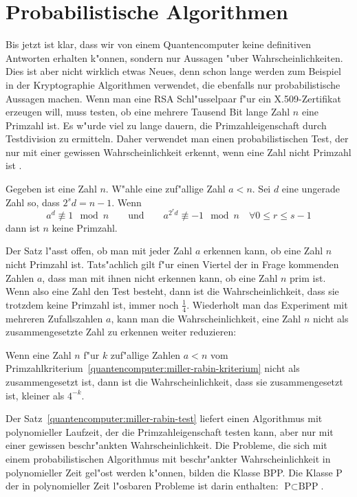 \section{Probabilistische Algorithmen}
Bis jetzt ist klar, dass wir von einem Quantencomputer keine definitiven
Antworten erhalten k"onnen, sondern nur Aussagen "uber Wahrscheinlichkeiten.
Dies ist aber nicht wirklich etwas Neues, denn schon lange werden
zum Beispiel in der Kryptographie Algorithmen verwendet, die ebenfalls
nur probabilistische Aussagen machen.
Wenn man eine RSA Schl"usselpaar f"ur ein X.509-Zertifikat erzeugen will,
muss testen, ob eine mehrere Tausend Bit lange Zahl $n$ eine Primzahl ist.
Es w"urde viel zu lange dauern, die Primzahleigenschaft durch Testdivision 
zu ermitteln.
Daher verwendet man einen probabilistischen Test, der nur mit einer
gewissen Wahrscheinlichkeit erkennt, wenn eine Zahl nicht Primzahl ist
\cite{skript:miller-rabin}.

\begin{satz}
\label{quantencomputer:miller-rabin-kriterium}
Gegeben ist eine Zahl $n$. W"ahle eine zuf"allige Zahl $a<n$. Sei $d$
eine ungerade Zahl so, dass $2^sd=n-1$. Wenn 
\[
a^d\not\equiv 1\mod n
\qquad\text{und}\qquad
a^{2^rd}\not\equiv -1\mod n\quad\forall 0\le r\le s-1
\]
dann ist $n$ keine Primzahl.
\end{satz}

Der Satz l"asst offen, ob man mit jeder Zahl $a$ erkennen kann, ob
eine Zahl $n$ nicht Primzahl ist.
Tats"achlich gilt f"ur einen Viertel der in Frage kommenden Zahlen
$a$, dass man mit ihnen nicht erkennen kann, ob eine Zahl $n$ prim ist.
Wenn also eine Zahl den Test besteht, dann ist die Wahrscheinlichkeit,
dass sie trotzdem keine Primzahl ist, immer noch $\frac14$. Wiederholt
man das Experiment mit mehreren Zufallszahlen $a$, kann man die
Wahrscheinlichkeit, eine Zahl $n$ nicht als zusammengesetzte Zahl zu
erkennen weiter reduzieren:

\begin{satz}
\label{quantencomputer:miller-rabin-test}
Wenn eine Zahl $n$ f"ur $k$ zuf"allige Zahlen $a<n$ vom
Primzahlkriterium~\ref{quantencomputer:miller-rabin-kriterium}
nicht als zusammengesetzt ist, dann ist die Wahrscheinlichkeit,
dass sie zusammengesetzt ist, kleiner als $4^{-k}$.
\end{satz}

Der Satz~\ref{quantencomputer:miller-rabin-test} liefert einen Algorithmus
mit polynomieller Laufzeit, der die Primzahleigenschaft testen kann,
aber nur mit einer gewissen beschr"ankten Wahrscheinlichkeit.
Die Probleme, die sich mit einem probabilistischen Algorithmus mit
beschr"ankter Wahrscheinlichkeit in polynomieller Zeit gel"ost
werden k"onnen, bilden die Klasse BPP.
Die Klasse P der in polynomieller Zeit l"osbaren Probleme ist darin
enthalten: $\text{P}\subset\text{BPP}$.

